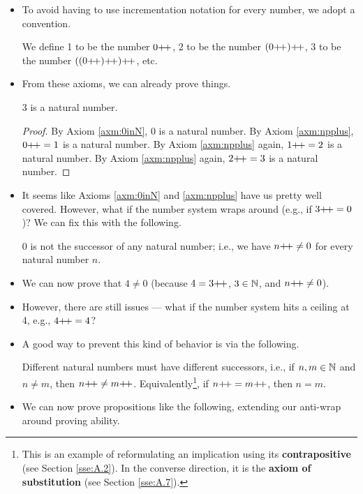 \documentclass[../main.tex]{subfiles}
\begin{document}
\begin{itemize}
\begin{axm}
    \end{axm}
    \item To avoid having to use incrementation notation for every number, we adopt a convention.
    \begin{dfn}
        We define 1 to be the number $0{+\!+}$, 2 to be the number $(0{+\!+}){+\!+}$, 3 to be the number $((0{+\!+}){+\!+}){+\!+}$, etc.
    \end{dfn}
    \item From these axioms, we can already prove things.
    \begin{prp}
        3 is a natural number.
        \begin{proof}
            By Axiom \ref{axm:0inN}, 0 is a natural number. By Axiom \ref{axm:npplus}, $0{+\!+}=1$ is a natural number. By Axiom \ref{axm:npplus} again, $1{+\!+}=2$ is a natural number. By Axiom \ref{axm:npplus} again, $2{+\!+}=3$ is a natural number.
        \end{proof}
    \end{prp}
    \item It seems like Axioms \ref{axm:0inN} and \ref{axm:npplus} have us pretty well covered. However, what if the number system wraps around (e.g., if $3{+\!+}=0$)? We can fix this with the following.
    \begin{axm}\label{axm:0NotSuccessor}
        0 is not the successor of any natural number; i.e., we have $n{+\!+}\neq 0$ for every natural number $n$.
    \end{axm}
    \item We can now prove that $4\neq 0$ (because $4=3{+\!+}$, $3\in\mathbb{N}$, and $n{+\!+}\neq 0$).
    \item However, there are still issues --- what if the number system hits a ceiling at 4, e.g., $4{+\!+}=4$?
    \item A good way to prevent this kind of behavior is via the following.
    \begin{axm}\label{axm:successorDistinctness}
        Different natural numbers must have different successors, i.e., if $n,m\in\mathbb{N}$ and $n\neq m$, then $n{+\!+}\neq m{+\!+}$. Equivalently\footnote{This is an example of reformulating an implication using its \textbf{contrapositive} (see Section \ref{sse:A.2}). In the converse direction, it is the \textbf{axiom of substitution} (see Section \ref{sse:A.7}).}, if $n{+\!+}=m{+\!+}$, then $n=m$.
    \end{axm}
    \item We can now prove propositions like the following, extending our anti-wrap around proving ability.

\end{itemize}
\end{document}
